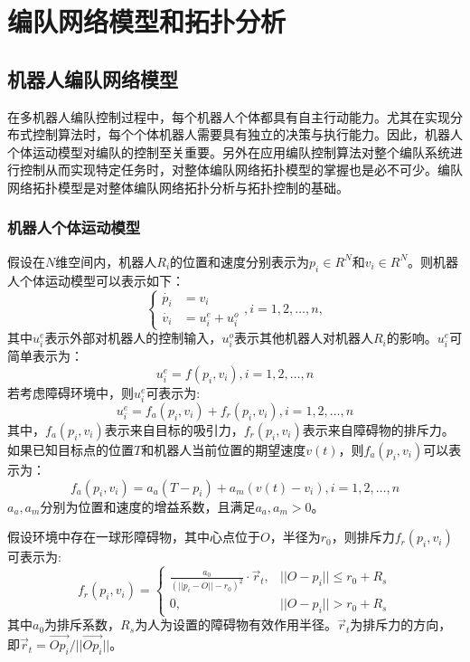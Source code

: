 

\chapter{编队网络模型和拓扑分析}
\label{chap:2}

\section{机器人编队网络模型}
在多机器人编队控制过程中，每个机器人个体都具有自主行动能力。尤其在实现分布式控制算法时，每个个体机器人需要具有独立的决策与执行能力。因此，机器人个体运动模型对编队的控制至关重要。另外在应用编队控制算法对整个编队系统进行控制从而实现特定任务时，对整体编队网络拓扑模型的掌握也是必不可少。编队网络拓扑模型是对整体编队网络拓扑分析与拓扑控制的基础\supercite{张飞2010}。

\subsection{机器人个体运动模型}
假设在$N$维空间内，机器人$R_i$的位置和速度分别表示为$p_i \in R^N$和$v_i \in R^N$。则机器人个体运动模型可以表示如下：
\begin{equation}
	\left\{
	\begin{aligned}
		\dot{p_i} & = v_i \\
		\dot{v_i} & = u_i^e + u_i^o
	\end{aligned}
	, i=1,2,\dots,n,
	\right.
\end{equation}
其中$u_i^e$表示外部对机器人的控制输入，$u_i^o$表示其他机器人对机器人$R_i$的影响。$u_i^e$可简单表示为：
\begin{equation}
	u_i^e = f(p_i,v_i), i=1,2,\dots,n
\end{equation}
若考虑障碍环境中，则$u_i^e$可表示为:
\begin{equation}
	\label{eq:outside_control}
	u_i^e = f_a(p_i,v_i) + f_r(p_i,v_i), i=1,2,\dots,n
\end{equation}
其中，$f_a(p_i,v_i)$表示来自目标的吸引力，$f_r(p_i,v_i)$表示来自障碍物的排斥力。如果已知目标点的位置$T$和机器人当前位置的期望速度$v(t)$，则$f_a(p_i,v_i)$可以表示为：
\begin{equation}
	\label{eq:object_control}
	f_a(p_i,v_i) = a_a(T-p_i) + a_m(v(t)-v_i), i=1,2,\dots,n
\end{equation}
$a_a,a_m$分别为位置和速度的增益系数，且满足$a_a,a_m > 0$。

假设环境中存在一球形障碍物，其中心点位于$O$，半径为$r_0$，则排斥力$f_r(p_i,v_i)$可表示为:
\begin{equation}
	f_r(p_i,v_i) = \begin{cases}
		\frac{a_0}{{(\lvert\lvert p_i-O \rvert\rvert -r_0)}^2} \cdot \vec{r}_t, & \lvert\lvert O-p_i \rvert\rvert \leq r_0 + R_s \\
		0, &  \lvert\lvert O-p_i \rvert\rvert > r_0 + R_s
	\end{cases}
\end{equation}
其中$a_0$为排斥系数，$R_s$为人为设置的障碍物有效作用半径。$\vec{r}_t$为排斥力的方向，即$\vec{r}_t = \vec{Op_i}/\lvert\lvert\vec{Op_i}\rvert\rvert$。
